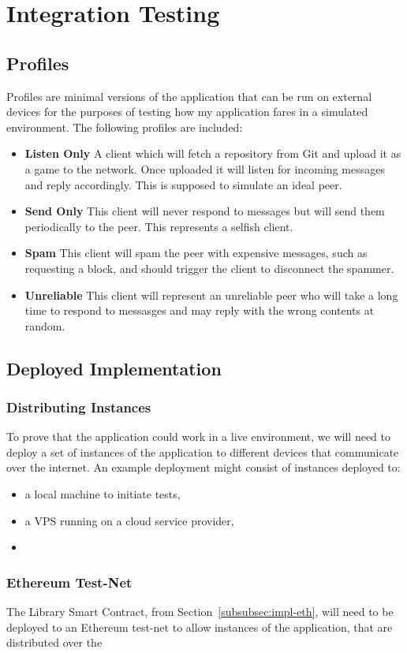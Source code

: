 \section{Integration Testing}

\subsection*{Profiles}

Profiles are minimal versions of the application that can be run on external devices for the purposes of testing how my application fares in a simulated environment. The following profiles are included:

\begin{itemize}
  \item \textbf{Listen Only} A client which will fetch a repository from Git and upload it as a game to the network. Once uploaded it will listen for incoming messages and reply accordingly. This is supposed to simulate an ideal peer.
  \item \textbf{Send Only} This client will never respond to messages but will send them periodically to the peer. This represents a selfish client.
  \item \textbf{Spam} This client will spam the peer with expensive messages, such as requesting a block, and should trigger the client to disconnect the spammer.
  \item \textbf{Unreliable} This client will represent an unreliable peer who will take a long time to respond to messasges and may reply with the wrong contents at random. 
\end{itemize}

\subsection*{Deployed Implementation}

\subsubsection*{Distributing Instances}

To prove that the application could work in a live environment, we will need to deploy a set of instances of the application to different devices that communicate over the internet. An example deployment might consist of instances deployed to:

\begin{itemize}
  \item a local machine to initiate tests,
  \item a VPS running on a cloud service provider,
  \item 
\end{itemize}

\subsubsection*{Ethereum Test-Net}

The Library Smart Contract, from Section~\ref{subsubsec:impl-eth}, will need to be deployed to an Ethereum test-net to allow instances of the application, that are distributed over the 